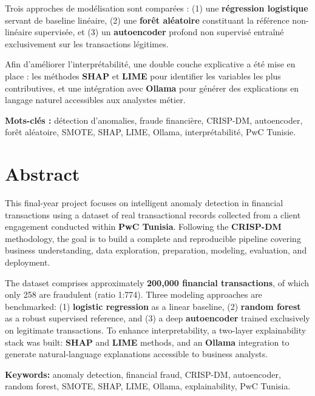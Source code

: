 \documentclass[12pt,a4paper,twoside]{report}
\begin{document}
Trois approches de modélisation sont comparées : (1) une \textbf{régression logistique}
servant de baseline linéaire, (2) une \textbf{forêt aléatoire} constituant la référence
non-linéaire supervisée, et (3) un \textbf{autoencoder} profond non supervisé entraîné
exclusivement sur les transactions légitimes.

Afin d'améliorer l'interprétabilité, une double couche explicative a été mise en place :
les méthodes \textbf{SHAP} et \textbf{LIME} pour identifier les variables les plus
contributives, et une intégration avec \textbf{Ollama} pour générer des explications
en langage naturel accessibles aux analystes métier.

\vspace{0.5cm}
\textbf{Mots-clés :} détection d'anomalies, fraude financière, CRISP-DM, autoencoder,
forêt aléatoire, SMOTE, SHAP, LIME, Ollama, interprétabilité, PwC Tunisie.

\newpage

\chapter*{Abstract}

This final-year project focuses on intelligent anomaly detection in financial transactions
using a dataset of real transactional records collected from a client engagement conducted
within \textbf{PwC Tunisia}. Following the \textbf{CRISP-DM} methodology, the goal is to
build a complete and reproducible pipeline covering business understanding, data exploration,
preparation, modeling, evaluation, and deployment.

The dataset comprises approximately \textbf{200,000 financial transactions}, of which only
258 are fraudulent (ratio 1:774). Three modeling approaches are benchmarked:
(1) \textbf{logistic regression} as a linear baseline, (2) \textbf{random forest} as a
robust supervised reference, and (3) a deep \textbf{autoencoder} trained exclusively on
legitimate transactions. To enhance interpretability, a two-layer explainability stack
was built: \textbf{SHAP} and \textbf{LIME} methods, and an \textbf{Ollama} integration
to generate natural-language explanations accessible to business analysts.

\vspace{0.5cm}
\textbf{Keywords:} anomaly detection, financial fraud, CRISP-DM, autoencoder, random
forest, SMOTE, SHAP, LIME, Ollama, explainability, PwC Tunisia.
\end{document}
